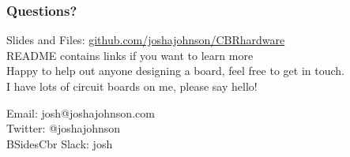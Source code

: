 \documentclass[t]{beamer}
\begin{document}
\begin{frame}
\frametitle{Questions?}
Slides and Files: \url{github.com/joshajohnson/CBRhardware}\\[10pt]
README contains links if you want to learn more\\[10pt]
Happy to help out anyone designing a board, feel free to get in touch. \\[10pt]
I have lots of circuit boards on me, please say hello!
\vspace{5mm}

Email: josh@joshajohnson.com\\
Twitter: @\textunderscore joshajohnson\\
BSidesCbr Slack: josh\\
\vspace{4mm}
\end{frame}
\end{document}
